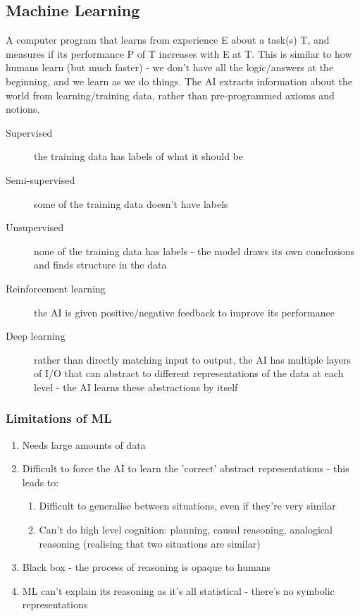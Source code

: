 \subsection{Machine Learning}
A computer program that learns from experience E about a task(s) T, and measures if its performance P of T increases with E at T. This is similar to how humans learn (but much faster) - we don't have all the logic/answers at the beginning, and we learn as we do things. The AI extracts information about the world from learning/training data, rather than pre-programmed axioms and notions.
\begin{description}
    \item[Supervised] the training data has labels of what it should be
    \item[Semi-supervised] some of the training data doesn't have labels
    \item[Unsupervised] none of the training data has labels - the model draws its own conclusions and finds structure in the data
    \item[Reinforcement learning] the AI is given positive/negative feedback to improve its performance
    \item[Deep learning] rather than directly matching input to output, the AI has multiple layers of I/O that can abstract to different representations of the data at each level - the AI learns these abstractions by itself
\end{description}

\subsubsection{Limitations of ML}
\begin{enumerate}
    \item Needs large amounts of data
    \item Difficult to force the AI to learn the 'correct' abstract representations - this leads to:
    \begin{enumerate}
        \item Difficult to generalise between situations, even if they're very similar
        \item Can't do high level cognition: planning, causal reasoning, analogical reasoning (realising that two situations are similar)
    \end{enumerate}
    \item Black box - the process of reasoning is opaque to humans
    \item ML can't explain its reasoning as it's all statistical - there's no symbolic representations
\end{enumerate}

